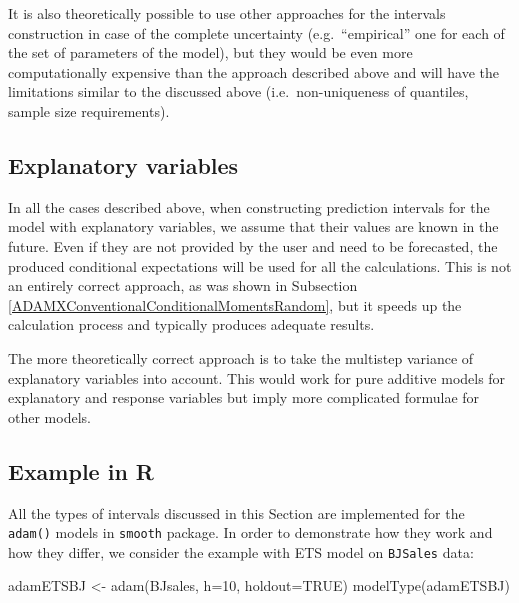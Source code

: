 \documentclass[
]{book}
\newenvironment{Shaded}{\begin{snugshade}}{\end{snugshade}}
\newcommand{\AttributeTok}[1]{\textcolor[rgb]{0.77,0.63,0.00}{#1}}
\newcommand{\ConstantTok}[1]{\textcolor[rgb]{0.00,0.00,0.00}{#1}}
\newcommand{\DecValTok}[1]{\textcolor[rgb]{0.00,0.00,0.81}{#1}}
\newcommand{\FunctionTok}[1]{\textcolor[rgb]{0.00,0.00,0.00}{#1}}
\newcommand{\NormalTok}[1]{#1}
\newcommand{\OtherTok}[1]{\textcolor[rgb]{0.56,0.35,0.01}{#1}}
\theoremstyle{definition}
\theoremstyle{definition}
\theoremstyle{definition}
\theoremstyle{definition}
\theoremstyle{remark}
\begin{document}
It is also theoretically possible to use other approaches for the intervals construction in case of the complete uncertainty (e.g.~``empirical'' one for each of the set of parameters of the model), but they would be even more computationally expensive than the approach described above and will have the limitations similar to the discussed above (i.e.~non-uniqueness of quantiles, sample size requirements).

\hypertarget{explanatory-variables-1}{%
\subsection{Explanatory variables}\label{explanatory-variables-1}}

In all the cases described above, when constructing prediction intervals for the model with explanatory variables, we assume that their values are known in the future. Even if they are not provided by the user and need to be forecasted, the produced conditional expectations will be used for all the calculations. This is not an entirely correct approach, as was shown in Subsection \ref{ADAMXConventionalConditionalMomentsRandom}, but it speeds up the calculation process and typically produces adequate results.

The more theoretically correct approach is to take the multistep variance of explanatory variables into account. This would work for pure additive models for explanatory and response variables but imply more complicated formulae for other models.

\hypertarget{ADAMForecastingPIExample}{%
\subsection{Example in R}\label{ADAMForecastingPIExample}}

All the types of intervals discussed in this Section are implemented for the \texttt{adam()} models in \texttt{smooth} package. In order to demonstrate how they work and how they differ, we consider the example with ETS model on \texttt{BJSales} data:

\begin{Shaded}
\begin{Highlighting}[]
\NormalTok{adamETSBJ }\OtherTok{\textless{}{-}} \FunctionTok{adam}\NormalTok{(BJsales, }\AttributeTok{h=}\DecValTok{10}\NormalTok{, }\AttributeTok{holdout=}\ConstantTok{TRUE}\NormalTok{)}
\FunctionTok{modelType}\NormalTok{(adamETSBJ)}
\end{Highlighting}
\end{Shaded}
\end{document}
